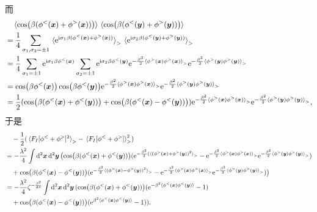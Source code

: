 \documentclass[hyperref, UTF8, a4paper]{ctexart}
\newcommand*{\ii}{\mathrm{i}}
\newcommand*{\ee}{\mathrm{e}}
\begin{document}
而
\[
    \begin{aligned}
        &\quad \expval*{\cos(\beta (\phi^<(\vb*{x}) + \phi^>(\vb*{x})))} \expval*{\cos(\beta (\phi^<(\vb*{y}) + \phi^>(\vb*{y})))} \\
        &= \frac{1}{4} \sum_{\sigma_1, \sigma_2 = \pm 1} \expval*{\ee^{\ii \sigma_1 \beta (\phi^<(\vb*{x}) + \phi^>(\vb*{x}))}}_> \expval*{\ee^{\ii \sigma_2 \beta (\phi^<(\vb*{y}) + \phi^>(\vb*{y}))}}_> \\
        &= \frac{1}{4} \sum_{\sigma_1=\pm 1} \ee^{\ii \sigma_1 \beta \phi^<(\vb*{x})} \sum_{\sigma_2 = \pm 1} \ee^{\ii \sigma_2 \beta \phi^<(\vb*{y})} \ee^{- \frac{\beta^2}{2} \expval*{\phi^>(\vb*{x}) \phi^>(\vb*{x})}_>} \ee^{- \frac{\beta^2}{2} \expval*{\phi^>(\vb*{y}) \phi^>(\vb*{y})}_>} \\
        &= \cos(\beta \phi^<(\vb*{x})) \cos(\beta \phi^<(\vb*{y})) \ee^{- \frac{\beta^2}{2} \expval*{\phi^>(\vb*{x}) \phi^>(\vb*{x})}_>} \ee^{- \frac{\beta^2}{2} \expval*{\phi^>(\vb*{y}) \phi^>(\vb*{y})}_>} \\
        &= \frac{1}{2} (\cos(\beta (\phi^<(\vb*{x}) + \phi^<(\vb*{y}))) + \cos(\beta (\phi^<(\vb*{x}) - \phi^<(\vb*{y})))) \ee^{- \frac{\beta^2}{2} \expval*{\phi^>(\vb*{x}) \phi^>(\vb*{x})}_>} \ee^{- \frac{\beta^2}{2} \expval*{\phi^>(\vb*{y}) \phi^>(\vb*{y})}_>},
    \end{aligned}
\]
于是
\[
    \begin{aligned}
        &\quad - \frac{1}{2} (\expval*{F_I[\phi^<+\phi^>]^2}_> - \expval*{F_I[\phi^<+\phi^>]}_>^2) \\
        &= - \frac{\lambda^2}{4} \int \dd[2]{\vb*{x}} \dd[2]{\vb*{y}} \bigl( \cos(\beta (\phi^<(\vb*{x}) + \phi^<(\vb*{y}))) (\ee^{- \frac{\beta^2}{2} (\expval*{(\phi^>(\vb*{x}) + \phi^>(\vb*{y}))^2}_>} - \ee^{- \frac{\beta^2}{2} \expval*{\phi^>(\vb*{x}) \phi^>(\vb*{x})}_>} \ee^{- \frac{\beta^2}{2} \expval*{\phi^>(\vb*{y}) \phi^>(\vb*{y})}_>}) \\
        &\quad + \cos(\beta (\phi^<(\vb*{x}) - \phi^<(\vb*{y}))) (\ee^{- \frac{\beta^2}{2} \expval*{(\phi^>(\vb*{x}) - \phi^>(\vb*{y}))^2}_>} - \ee^{- \frac{\beta^2}{2} \expval*{\phi^>(\vb*{x}) \phi^>(\vb*{x})}_>} \ee^{- \frac{\beta^2}{2} \expval*{\phi^>(\vb*{y}) \phi^>(\vb*{y})}_>})
        \bigr) \\
        &= - \frac{\lambda^2}{4} \zeta^{- \frac{\beta^2}{2 \pi}} \int \dd[2]{\vb*{x}} \dd[2]{\vb*{y}} (\cos(\beta(\phi^<(\vb*{x}) + \phi^<(\vb*{y}))) (\ee^{- \beta^2 \expval*{\phi^<(\vb*{x}) \phi^<(\vb*{y})}} - 1) \\
        &\quad + \cos(\beta(\phi^<(\vb*{x}) - \phi^<(\vb*{y}))) (\ee^{ \beta^2 \expval*{\phi^<(\vb*{x}) \phi^<(\vb*{y})}} - 1)).
    \end{aligned}
\]
\end{document}
